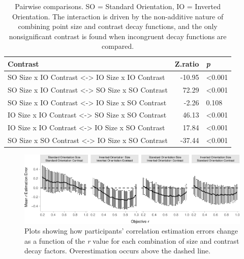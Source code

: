 \documentclass[manuscript, review, anonymous, screen]{acmart}
\begin{document}
\hypertarget{tbl-contrasts}{}
\begin{table}
\caption{\label{tbl-contrasts}Pairwise comparisons. SO = Standard Orientation, IO = Inverted
Orientation. The interaction is driven by the non-additive nature of
combining point size and contrast decay functions, and the only
nonsignificant contrast is found when incongruent decay functions are
compared. }\tabularnewline

\centering
\begin{tabular}{lrl}
\toprule
Contrast & Z.ratio & \textit{p}\\
\midrule
SO Size x IO Contrast <-> IO Size x IO Contrast & -10.95 & <0.001\\
SO Size x IO Contrast <-> SO Size x SO Contrast & 72.29 & <0.001\\
SO Size x IO Contrast <-> IO Size x SO Contrast & -2.26 & 0.108\\
IO Size x IO Contrast <-> SO Size x SO Contrast & 46.13 & <0.001\\
IO Size x IO Contrast <-> IO Size x SO Contrast & 17.84 & <0.001\\
SO Size x SO Contrast <-> IO Size x SO Contrast & -37.44 & <0.001\\
\bottomrule
\end{tabular}
\end{table}

\begin{figure}

{\centering \includegraphics[width=1\textwidth,height=\textheight]{size_and_contrast_files/figure-pdf/fig-diff-error-bars-plot-1.pdf}

}

\caption{\label{fig-diff-error-bars-plot}Plots showing how participants'
correlation estimation errors change as a function of the \emph{r} value
for each combination of size and contrast decay factors. Overestimation
occurs above the dashed line.}
\end{figure}
\end{document}
